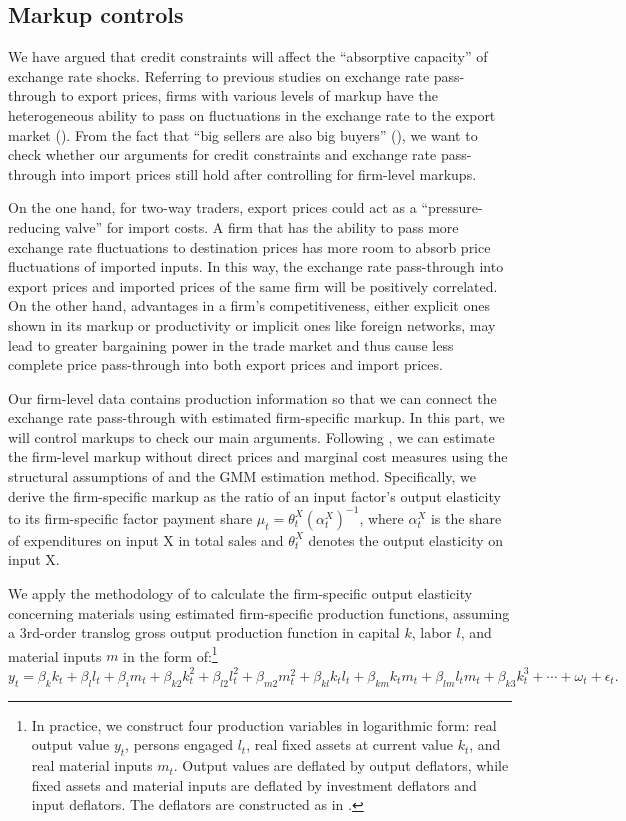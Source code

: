 \subsection{Markup controls}

We have argued that credit constraints will affect the ``absorptive capacity'' of exchange rate shocks. Referring to previous studies on exchange rate pass-through to export prices, firms with various levels of markup have the heterogeneous ability to pass on fluctuations in the exchange rate to the export market (\cite{aik2019}). From the fact that ``big sellers are also big buyers'' (\cite{aik2014}), we want to check whether our arguments for credit constraints and exchange rate pass-through into import prices still hold after controlling for firm-level markups.

On the one hand, for two-way traders, export prices could act as a ``pressure-reducing valve'' for import costs. A firm that has the ability to pass more exchange rate fluctuations to destination prices has more room to absorb price fluctuations of imported inputs. In this way, the exchange rate pass-through into export prices and imported prices of the same firm will be positively correlated. On the other hand, advantages in a firm's competitiveness, either explicit ones shown in its markup or productivity or implicit ones like foreign networks, may lead to greater bargaining power in the trade market and thus cause less complete price pass-through into both export prices and import prices.

Our firm-level data contains production information so that we can connect the exchange rate pass-through with estimated firm-specific markup. In this part, we will control markups to check our main arguments. Following \cite{bkl2021}, we can estimate the firm-level markup without direct prices and marginal cost measures using the structural assumptions of \cite{dlw2012} and the GMM estimation method. Specifically, we derive the firm-specific markup as the ratio of an input factor's output elasticity to its firm-specific factor payment share $\mu_{t}=\theta_{t}^{X}\left(\alpha_{t}^{X}\right)^{-1}$, where $\alpha_{t}^{X}$ is the share of expenditures on input X in total sales and $\theta^X_t$ denotes the output elasticity on input X. 

We apply the methodology of \cite{acf2015} to calculate the firm-specific output elasticity concerning materials using estimated firm-specific production functions, assuming a 3rd-order translog gross output production function in capital $k$, labor $l$, and material inputs $m$ in the form of:\footnote{In practice, we construct four production variables in logarithmic form: real output value $y_t$, persons engaged $l_t$, real fixed assets at current value $k_t$, and real material inputs $m_t$. Output values are deflated by output deflators, while fixed assets and material inputs are deflated by investment deflators and input deflators. The deflators are constructed as in \cite{brandt2012}.} $ y_{t}= \beta_{k} k_{t}+\beta_{l} l_{t}+\beta_{i} m_{t}+\beta_{k 2} k_{t}^{2}+\beta_{l 2} l_{t}^{2}+\beta_{m 2} m_{t}^{2}+ \beta_{k l} k_{ t} l_{t}+\beta_{k m} k_{t} m_{t}+\beta_{l m} l_{t} m_{t}+\beta_{k 3} k_{t}^{3}+\cdots+\omega_{t}+\epsilon_{t}.
$

